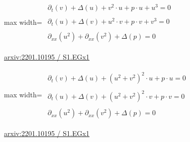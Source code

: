 \documentclass[10pt,a4paper]{article}
\begin{document}
\begin{minipage}{\linewidth}
\begin{center}\begin{adjustbox}{max width=\linewidth}$\displaystyle\begin{gathered}\begin{gathered}\partial_{t}(v)+\Delta(u)+v^{2}\cdot u+p\cdot u+u^{3}=0\end{gathered}\\[5pt]\begin{gathered}\partial_{t}(u)+\Delta(v)+u^{2}\cdot v+p\cdot v+v^{3}=0\end{gathered}\\[5pt]\begin{gathered}\partial_{xx}(u^{2})+\partial_{xx}(v^{2})+\Delta(p)=0\end{gathered}\end{gathered}$\end{adjustbox}\end{center}
{\small \href{https://arxiv.org/html/2201.10195#S1.EGx1}{arxiv:2201.10195 / S1.EGx1}}\par
\end{minipage}\par\vspace{7mm}

\begin{minipage}{\linewidth}
\begin{center}\begin{adjustbox}{max width=\linewidth}$\displaystyle\begin{gathered}\begin{gathered}\partial_{t}(v)+\Delta(u)+(u^{2}+v^{2})^{2}\cdot u+p\cdot u=0\end{gathered}\\[5pt]\begin{gathered}\partial_{t}(u)+\Delta(v)+(u^{2}+v^{2})^{2}\cdot v+p\cdot v=0\end{gathered}\\[5pt]\begin{gathered}\partial_{xx}(u^{2})+\partial_{xx}(v^{2})+\Delta(p)=0\end{gathered}\end{gathered}$\end{adjustbox}\end{center}
{\small \href{https://arxiv.org/html/2201.10195#S1.EGx1}{arxiv:2201.10195 / S1.EGx1}}\par
\end{minipage}\par\vspace{7mm}
\end{document}

